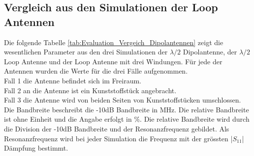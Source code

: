 

\newpage
\subsection{Vergleich aus den Simulationen der Loop Antennen}
Die folgende Tabelle \ref{tab:Evaluation_Vergeich_Dipolantennen} zeigt die wesentlichen Parameter aus den drei Simulationen der $\lambda/2$ Dipolantenne, der $\lambda/2$ Loop Antenne und der Loop Antenne mit drei Windungen. Für jede der Antennen wurden die Werte für die drei Fälle aufgenommen.\\
Fall 1 die Antenne befindet sich im Freiraum.\\
Fall 2 an die Antenne ist ein Kunststoffstück angebracht.\\
Fall 3 die Antenne wird von beiden Seiten von Kunststoffstücken umschlossen.\\
Die Bandbreite beschreibt die -10dB Bandbreite in MHz. Die relative Bandbreite ist ohne Einheit und die Angabe erfolgt in $\%$. Die relative Bandbreite wird durch die Division der -10dB Bandbreite und der Resonanzfrequenz gebildet. Als Resonanzfrequenz wird bei jeder Simulation die Frequenz mit der grössten |$S_{11}$| Dämpfung bestimmt.\\


